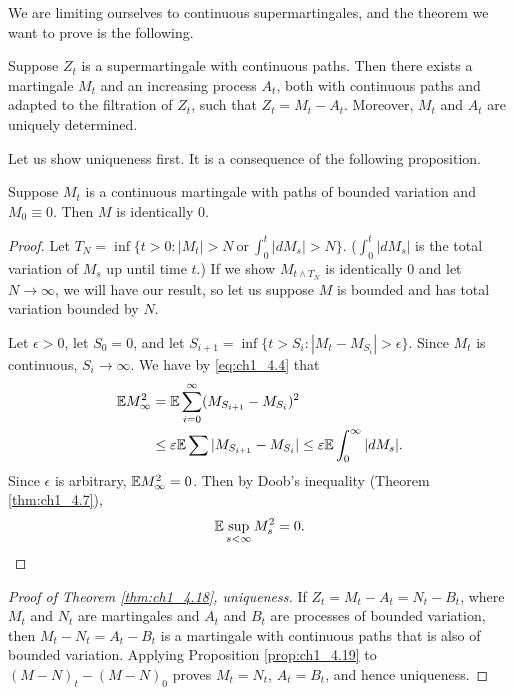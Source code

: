 We are limiting ourselves to continuous supermartingales, and the theorem we want to prove is the following.

\begin{theorem}\label{thm:ch1_4.18}
Suppose $Z_t$ is a supermartingale with continuous paths. Then there exists a martingale $M_t$ and an increasing process $A_t$, both with continuous paths and adapted to the filtration of $Z_t$, such that $Z_t = M_t - A_t$. Moreover, $M_t$ and $A_t$ are uniquely determined.
\end{theorem}

Let us show uniqueness first. It is a consequence of the following proposition.

\begin{proposition}\label{prop:ch1_4.19}
Suppose $M_t$ is a continuous martingale with paths of bounded variation and $M_0 \equiv 0$. Then $M$ is identically $0$.
\end{proposition}

\begin{proof}
Let $T_N = \inf\{t > 0 : |M_t| > N~\text{or}~\int_0^t |dM_s| > N\}$. ($\int_0^t |dM_s|$ is the total variation of $M_s$ up until time $t$.) If we show $M_{t\wedge T_N}$ is identically $0$ and let $N \to \infty$, we will have our result, so let us suppose $M$ is bounded and has total variation bounded by $N$.

Let $\epsilon > 0$, let $S_0 = 0$, and let $S_{i+1} = \inf\{t > S_i : |M_t - M_{S_i}| > \epsilon\}$. Since $M_t$ is continuous, $S_i \to \infty$. We have by \eqref{eq:ch1_4.4} that
\begin{align*}
    \mathbb{E} M_\infty^2 &= \mathbb{E} \sum_{i=0}^{\infty}(M_{S_{i+1}} - M_{S_i})^2 \\
    &\leq \varepsilon\mathbb{E} \sum|M_{S_{i+1}} - M_{S_i}| \leq \varepsilon\mathbb{E} \int_0^\infty |dM_s|.
\end{align*}
Since $\epsilon$ is arbitrary, $\mathbb{E} M_\infty^2 = 0$. Then by Doob's inequality (Theorem \ref{thm:ch1_4.7}),
\[
    \mathbb{E} \sup_{s<\infty} M_s^2 = 0.
\]
\end{proof}

\begin{proof}[Proof of Theorem \ref{thm:ch1_4.18}, uniqueness]
If $Z_t = M_t - A_t = N_t - B_t$, where $M_t$ and $N_t$ are martingales and $A_t$ and $B_t$ are processes of bounded variation, then $M_t - N_t = A_t - B_t$ is a martingale with continuous paths that is also of bounded variation. Applying Proposition \ref{prop:ch1_4.19} to $(M - N)_t - (M - N)_0$ proves $M_t = N_t$, $A_t = B_t$, and hence uniqueness.
\end{proof}

